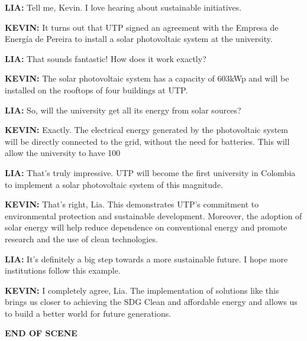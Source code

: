 \documentclass{article}
\begin{document}
\textbf{LIA:} Tell me, Kevin. I love hearing about sustainable initiatives.

\textbf{KEVIN:} It turns out that UTP signed an agreement with the Empresa de Energía de Pereira to install a solar photovoltaic system at the university.

\textbf{LIA:} That sounds fantastic! How does it work exactly?

\textbf{KEVIN:} The solar photovoltaic system has a capacity of 603kWp and will be installed on the rooftops of four buildings at UTP.

\textbf{LIA:} So, will the university get all its energy from solar sources?

\textbf{KEVIN:} Exactly. The electrical energy generated by the photovoltaic system will be directly connected to the grid, without the need for batteries. This will allow the university to have 100%

\textbf{LIA:} That's truly impressive. UTP will become the first university in Colombia to implement a solar photovoltaic system of this magnitude.

\textbf{KEVIN:} That's right, Lia. This demonstrates UTP's commitment to environmental protection and sustainable development. Moreover, the adoption of solar energy will help reduce dependence on conventional energy and promote research and the use of clean technologies.

\textbf{LIA:} It's definitely a big step towards a more sustainable future. I hope more institutions follow this example.

\textbf{KEVIN:} I completely agree, Lia. The implementation of solutions like this brings us closer to achieving the SDG Clean and affordable energy and allows us to build a better world for future generations.

\textbf{END OF SCENE}
\end{document}
